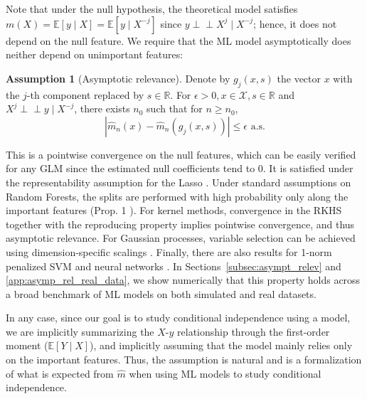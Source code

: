 \documentclass{article}
\theoremstyle{plain}
\theoremstyle{definition}
\newtheorem{assumption}[theorem]{Assumption}
\theoremstyle{remark}
\newcommand{\e}[1]{\mathbb{E}\left[#1\right]  } %
\newcommand{\indep}{\perp\!\!\!\perp}
\begin{document}

Note that under the null hypothesis, the theoretical model satisfies
$m(X)=\mathbb{E}[y \mid X]=\mathbb{E}[y \mid X^{-j}]$ since $y \indep X^j \mid X^{-j}$; hence, it does not depend on the null feature.
We require that the ML model asymptotically does neither depend on unimportant features:
%
\begin{assumption}[Asymptotic relevance]\label{ass:asymp_relevance}
Denote by $g_j(x, s)$ the vector $x$ with the $j$-th component replaced by $s \in \mathbb{R}$. For $\epsilon>0, x\in\mathcal{X},s\in\mathbb{R}$ and $X^j\indep y\mid X^{-j}$, there exists $n_0$ such that for $n\geq n_0$, $$|\hat{m}_n(x)-\hat{m}_n(g_j(x, s))|\leq \epsilon\text{ a.s}.$$
\end{assumption}
%
This is a pointwise convergence on the null features, which can be easily verified for any GLM since the estimated null coefficients tend to 0. It is satisfied under the representability assumption for the Lasso \citep{asymp_rel_lasso}. Under standard assumptions on Random Forests, the splits are performed with high probability only along the important features  (Prop. 1 \citet{Scornet_2015ConsistencyRF}). For kernel methods, convergence in the RKHS together with the reproducing property implies pointwise convergence, and thus asymptotic relevance. For Gaussian processes, variable selection can be achieved using dimension-specific scalings \citep{Bhattacharya_2014}. Finally, there are also results for 1-norm penalized SVM \citep{1_pen_svm} and neural networks \citep{NEURIPS2020_1959eb9d}. In Sections~\ref{subsec:asympt_relev} and \ref{app:asymp_rel_real_data}, we show numerically that this property holds across a broad benchmark of ML models on both simulated and real datasets.

In any case, since our goal is to study conditional independence using a model, we are implicitly summarizing the $X$-$y$ relationship through the first-order moment ($\e{Y \mid X}$), and implicitly assuming that the model mainly relies only on the important features. Thus, the assumption is natural and is a formalization of what is expected from $\widehat{m}$ when using ML models to study conditional independence.
\end{document}
